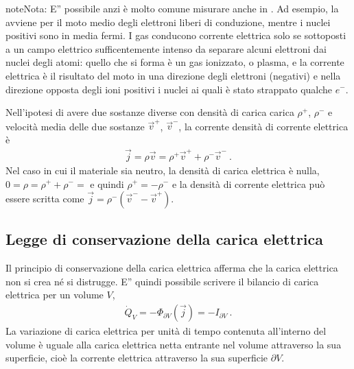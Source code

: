 \documentclass[letterpaper,10pt,italian]{jupyterBook}
\begin{document}
\begin{sphinxadmonition}{note}{Nota:}
\sphinxAtStartPar
E” possibile \sphinxhyphen{} anzi è molto comune \sphinxhyphen{} misurare  anche in . Ad esempio, la {\hyperref[\detokenize{ch/electromagnetism/electric-current:physics-hs-electromagnetism-electric-current-solids-conductor}]{}} avviene per il moto medio degli elettroni liberi di conduzione, mentre i nuclei positivi sono in media fermi. I gas conducono corrente elettrica solo se sottoposti a un campo elettrico sufficentemente intenso da separare alcuni elettroni dai nuclei degli atomi: quello che si forma è un gas ionizzato, o plasma, e la corrente elettrica è il risultato del moto in una direzione degli elettroni (negativi) e nella direzione opposta degli ioni positivi \sphinxhyphen{} i nuclei ai quali è stato strappato qualche \(e^-\).

\sphinxAtStartPar
Nell’ipotesi di avere due sostanze diverse con densità di carica carica \(\rho^+\), \(\rho^-\) e velocità media delle due sostanze \(\vec{v}^+\), \(\vec{v}^-\), la corrente densità di corrente elettrica è
\begin{equation*}
\begin{split}\vec{j} = \rho \vec{v} = \rho^+ \vec{v}^+ + \rho^- \vec{v}^- \ . \end{split}
\end{equation*}
\sphinxAtStartPar
Nel caso in cui il materiale sia neutro, la densità di carica elettrica è nulla, \(0 = \rho = \rho^+ + \rho^- =\) e quindi \(\rho^+ = - \rho^-\) e la densità di corrente elettrica può essere scritta come \(\vec{j} = \rho^- (\vec{v}^- - \vec{v}^+)\).
\end{sphinxadmonition}
\label{\detokenize{ch/electromagnetism/electric-current:electric-current-cable}}





\subsection{Legge di conservazione della carica elettrica}
\label{\detokenize{ch/electromagnetism/electric-current:legge-di-conservazione-della-carica-elettrica}}\label{\detokenize{ch/electromagnetism/electric-current:physics-hs-electromagnetism-charge-conservation}}
\sphinxAtStartPar
Il principio di conservazione della carica elettrica afferma che la carica elettrica non si crea né si distrugge. E” quindi possibile scrivere il bilancio di carica elettrica per un volume \(V\),
\begin{equation*}
\begin{split}\dot{Q}_V = - \Phi_{\partial V}(\vec{j}) = - I_{\partial V} \ .\end{split}
\end{equation*}
\sphinxAtStartPar
La variazione di carica elettrica per unità di tempo contenuta all’interno del volume è uguale alla carica elettrica netta entrante nel volume attraverso la sua superficie, cioè la corrente elettrica attraverso la sua superficie \(\partial V\).
\end{document}
